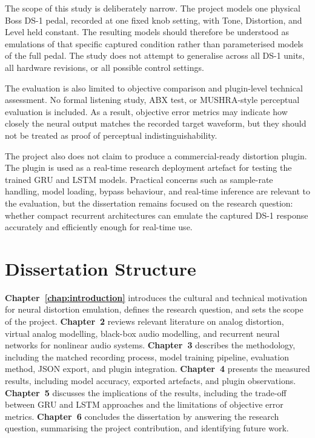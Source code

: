 The scope of this study is deliberately narrow. The project models one physical Boss DS-1 pedal, recorded at one fixed knob setting, with Tone, Distortion, and Level held constant. The resulting models should therefore be understood as emulations of that specific captured condition rather than parameterised models of the full pedal. The study does not attempt to generalise across all DS-1 units, all hardware revisions, or all possible control settings.

The evaluation is also limited to objective comparison and plugin-level technical assessment. No formal listening study, ABX test, or MUSHRA-style perceptual evaluation is included. As a result, objective error metrics may indicate how closely the neural output matches the recorded target waveform, but they should not be treated as proof of perceptual indistinguishability.

The project also does not claim to produce a commercial-ready distortion plugin. The plugin is used as a real-time research deployment artefact for testing the trained GRU and LSTM models. Practical concerns such as sample-rate handling, model loading, bypass behaviour, and real-time inference are relevant to the evaluation, but the dissertation remains focused on the research question: whether compact recurrent architectures can emulate the captured DS-1 response accurately and efficiently enough for real-time use.

\section{Dissertation Structure}
\label{sec:introduction-structure}

\textbf{Chapter~\ref{chap:introduction}} introduces the cultural and technical motivation for neural distortion emulation, defines the research question, and sets the scope of the project. \textbf{Chapter~2} reviews relevant literature on analog distortion, virtual analog modelling, black-box audio modelling, and recurrent neural networks for nonlinear audio systems. \textbf{Chapter~3} describes the methodology, including the matched recording process, model training pipeline, evaluation method, JSON export, and plugin integration. \textbf{Chapter~4} presents the measured results, including model accuracy, exported artefacts, and plugin observations. \textbf{Chapter~5} discusses the implications of the results, including the trade-off between GRU and LSTM approaches and the limitations of objective error metrics. \textbf{Chapter~6} concludes the dissertation by answering the research question, summarising the project contribution, and identifying future work.
